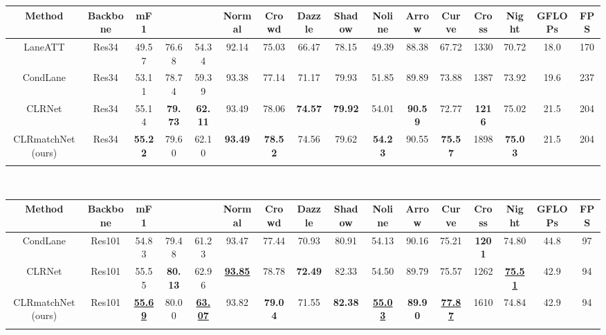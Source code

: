 \documentclass[10pt,twocolumn,letterpaper]{article}
\begin{document}
\begin{table*}[h]
\begin{adjustbox}{width=\textwidth} 
\begin{tabular}{cccccccccccccccc}
\hline
Method & Backbone & mF1 &  &    & Normal & Crowd & Dazzle & Shadow & Noline & Arrow& Curve  & Cross & Night & GFLOPs & FPS \\
\hline
LaneATT \cite{LaneATT} & Res34 & 49.57 & 76.68 & 54.34 &  92.14 & 75.03 & 66.47 & 78.15 & 49.39 & 88.38 & 67.72 & 1330 & 70.72 & 18.0 & 170 \\
CondLane\cite{CondLaneNet}  & Res34 & 53.11 & 78.74 & 59.39 & 93.38 & 77.14 &  71.17 & 79.93 & 51.85 & 89.89 & 73.88 & 1387 & 73.92 & 19.6 & 237\\
CLRNet\cite{CLRNet} & Res34 & 55.14 & \textbf{79.73} & \textbf{62.11} & 93.49 & 78.06 & \textbf{74.57} & \textbf{79.92} & 54.01 & \textbf{90.59} & 72.77 & \textbf{1216} & 75.02 & 21.5 &  204 \\
\hline
CLRmatchNet (ours)& Res34 & \textbf{55.22}& 79.60 & 62.10 & \textbf{93.49}\textbf{ }& \textbf{78.52} & 74.56 & 79.62 & \textbf{54.23} & 90.55 & \textbf{75.57} & 1898 & \textbf{75.03} & 21.5 & 204 \\
\hline
 &  &  &  &  &  &  &  &  &  &  &  &  &  &  &\\
\end{tabular}
\end{adjustbox}
\\
\begin{adjustbox}{width=\textwidth} 
\begin{tabular}{cccccccccccccccc}
\hline
Method & Backbone & mF1 &  &    & Normal & Crowd & Dazzle & Shadow & Noline & Arrow& Curve  & Cross & Night & GFLOPs & FPS \\
\hline
CondLane\cite{CondLaneNet}  & Res101 & 54.83 & 79.48 & 61.23 & 93.47 & 77.44 & 70.93 & 80.91 & 54.13 & 90.16 & 75.21 & \textbf{1201}& 74.80 & 44.8 & 97\\
CLRNet\cite{CLRNet} & Res101 & 55.55 & \textbf{80.13} & 62.96 & \underline{\textbf{93.85}} & 78.78 & \textbf{72.49} & 82.33 & 54.50 & 89.79 & 75.57 & 1262 & \underline{\textbf{75.51}} & 42.9 & 94 \\
\hline
CLRmatchNet (ours)& Res101 & \underline{\textbf{55.69}} & 80.00 & \underline{\textbf{63.07}} & 93.82 & \textbf{79.04} & 71.55 & \textbf{82.38} & \underline{\textbf{55.03}} & \textbf{89.90 }& \underline{\textbf{77.87}} & 1610 & 74.84 &  42.9 & 94 \\
\hline
 &  &  &  &  &  &  &  &  &  &  &  &  &  &  &\\

\end{tabular}
\end{adjustbox}
\end{table*}
\end{document}
